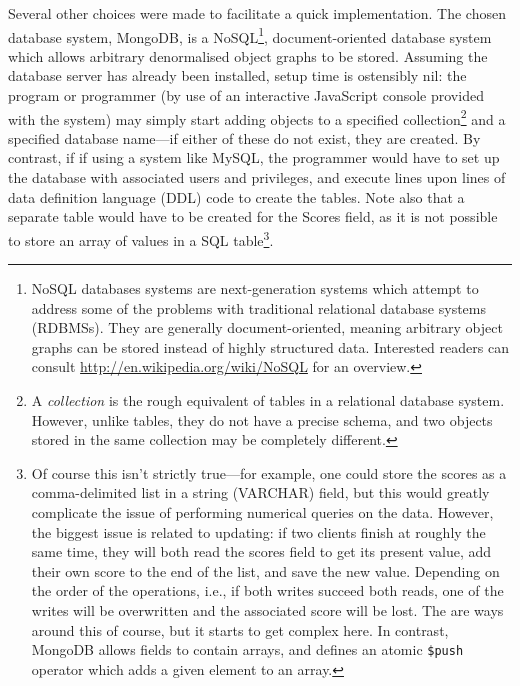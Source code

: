Several other choices were made to facilitate a quick implementation.  The chosen database system, MongoDB, is a NoSQL\footnote{NoSQL databases systems are next-generation systems which attempt to address some of the problems with traditional relational database systems (RDBMSs).  They are generally document-oriented, meaning arbitrary object graphs can be stored instead of highly structured data.  Interested readers can consult \url{http://en.wikipedia.org/wiki/NoSQL} for an overview.}, document-oriented database system which allows arbitrary denormalised object graphs to be stored.  Assuming the database server has already been installed, setup time is ostensibly nil: the program or programmer (by use of an interactive JavaScript console provided with the system) may simply start adding objects to a specified collection\footnote{A \emph{collection} is the rough equivalent of tables in a relational database system.  However, unlike tables, they do not have a precise schema, and two objects stored in the same collection may be completely different.} and a specified database name---if either of these do not exist, they are created.  By contrast, if if using a system like MySQL, the programmer would have to set up the database with associated users and privileges, and execute lines upon lines of data definition language (DDL) code to create the tables.  Note also that a separate table would have to be created for the Scores field, as it is not possible to store an array of values in a SQL table\footnote{Of course this isn't strictly true---for example, one could store the scores as a comma-delimited list in a string (VARCHAR) field, but this would greatly complicate the issue of performing numerical queries on the data.  However, the biggest issue is related to updating: if two clients finish at roughly the same time, they will both read the scores field to get its present value, add their own score to the end of the list, and save the new value.  Depending on the order of the operations, i.e., if both writes succeed both reads, one of the writes will be overwritten and the associated score will be lost.  The are ways around this of course, but it starts to get complex here.  In contrast, MongoDB allows fields to contain arrays, and defines an atomic {\tt\$push} operator which adds a given element to an array.}.


